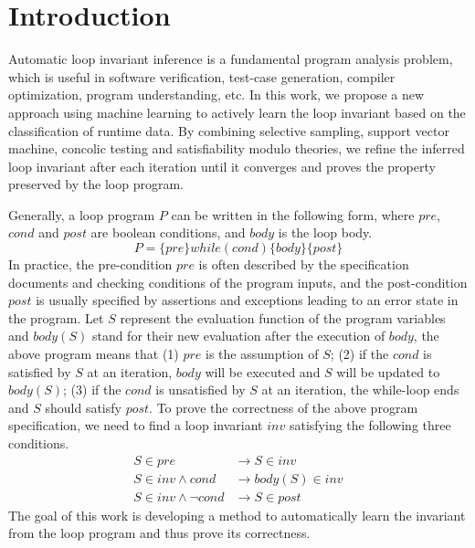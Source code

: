 
\section{Introduction}

Automatic loop invariant inference is a fundamental program analysis problem, 
which is useful in software verification, test-case generation, 
compiler optimization, program understanding, etc. 
In this work, we propose a new approach using machine learning 
to actively learn the loop invariant based on the classification of runtime data. 
By combining selective sampling, support vector machine, 
concolic testing and satisfiability modulo theories, 
we refine the inferred loop invariant after each iteration 
until it converges and proves the property preserved by the loop program. 

Generally, a loop program $P$ can be written in the following form, 
where $\mathit{pre}$, $\mathit{cond}$ and $\mathit{post}$ are boolean conditions, 
and $\mathit{body}$ is the loop body. 
\[
    P = \{ \mathit{pre} \} \mathit{while}(\mathit{cond}) \{ \mathit{body} \} \{ \mathit{post} \}
\]
In practice, the pre-condition $\mathit{pre}$ is often described by 
the specification documents and checking conditions of the program inputs, 
and the post-condition $\mathit{post}$ is usually specified 
by assertions and exceptions leading to an error state in the program. 
Let $S$ represent the evaluation function of the program variables 
and $\mathit{body}(S)$ stand for their new evaluation after the execution of $\mathit{body}$, 
the above program means that (1) $\mathit{pre}$ is the assumption of $S$; 
(2) if the $\mathit{cond}$ is satisfied by $S$ at an iteration, 
$\mathit{body}$ will be executed and $S$ will be updated to $\mathit{body}(S)$; 
(3) if the $\mathit{cond}$ is unsatisfied by $S$ at an iteration, 
the while-loop ends and $S$ should satisfy $\mathit{post}$. 
To prove the correctness of the above program specification, 
we need to find a loop invariant $\mathit{inv}$ satisfying the following three conditions. 
\begin{align}
    S \in \mathit{pre} 
        &\rightarrow S \in \mathit{inv} \label{inv:pre} \\
    S \in \mathit{inv} \land \mathit{cond} 
        &\rightarrow \mathit{body}(S) \in \mathit{inv} \label{inv:loop} \\
    S \in \mathit{inv} \land \neg\mathit{cond} 
        &\rightarrow S \in \mathit{post} \label{inv:post}
\end{align}
The goal of this work is developing a method to automatically learn 
the invariant from the loop program and thus prove its correctness. 

